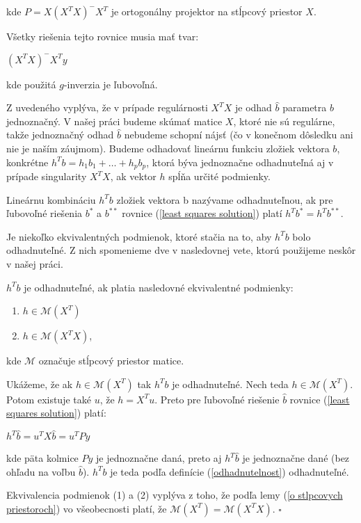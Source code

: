 kde $P = X (X^T X)^- X^T$ je ortogonálny projektor na stĺpcový priestor $X$.

Všetky riešenia tejto rovnice musia mať tvar:

\begin{center}
$
(X^T X)^- X^T y
$
\end{center}

kde použitá $g$-inverzia je ľubovoľná.

Z uvedeného vyplýva, že v prípade regulárnosti $X^T X$ je odhad $\hat{b}$ parametra $b$ jednoznačný. 
V našej práci budeme skúmať matice $X$, ktoré nie sú regulárne, 
takže jednoznačný odhad $\hat{b}$ nebudeme schopní nájsť (čo v konečnom dôsledku ani nie je naším záujmom).
Budeme odhadovať lineárnu funkciu zložiek vektora $b$, konkrétne $h^T b = h_1 b_1 + \ldots + h_p b_p$,
ktorá býva jednoznačne odhadnuteľná aj v prípade singularity $X^T X$, ak vektor $h$ spĺňa určité podmienky. 

\begin{defin}
\label{odhadnutelnost}
Lineárnu kombináciu $h^T b$ zložiek vektora b nazývame odhadnuteľnou,
ak pre ľubovoľné riešenia $b^*$ a $b^{**}$ rovnice (\ref{least squares solution}) platí $h^T b^* = h^T b^{**}$.
\end{defin}

Je niekoľko ekvivalentných podmienok, ktoré stačia na to, aby $h^T b$ bolo odhadnuteľné. 
Z nich spomenieme dve v nasledovnej vete, ktorú použijeme neskôr v našej práci.

\begin{theorem}
\label{veta1}
$h^T b$ je odhadnuteľné, ak platia nasledovné ekvivalentné podmienky:
\begin{enumerate}
  \item $h \in \mathcal{M}(X^T)$
  \item $h \in \mathcal{M}(X^T X)$,
\end{enumerate}
kde $\mathcal{M}$ označuje stĺpcový priestor matice.
\end{theorem}

\begin{dokaz}
Ukážeme, že ak $h \in \mathcal{M}(X^T)$ tak $h^T b$ je odhadnuteľné.
Nech teda $h \in \mathcal{M}(X^T)$. Potom existuje také $u$, že $h = X^T u$.
Preto pre ľubovoľné riešenie $\hat{b}$ rovnice (\ref{least squares solution}) platí:

\begin{center}
$
h^T \hat{b} = u^T X \hat{b} = u^T P y
$
\end{center}

kde päta kolmice $Py$ je jednoznačne daná, preto aj $h^T \hat{b}$ je jednoznačne dané (bez ohľadu na voľbu $\hat{b}$).
$h^T b$ je teda podľa definície (\ref{odhadnutelnost}) odhadnuteľné.

Ekvivalencia podmienok (1) a (2) vyplýva z toho, že podľa lemy (\ref{o stlpcovych priestoroch}) vo všeobecnosti platí, že $\mathcal{M}(X^T) = \mathcal{M}(X^T X)$.
$\square$
\end{dokaz}

